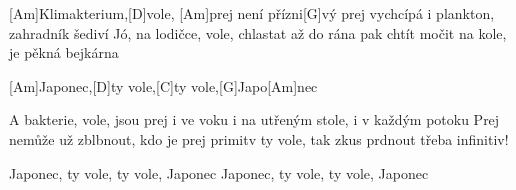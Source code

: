 
[Am]Klimakterium,[D]vole, [Am]prej není přízni[G]vý
prej vychcípá i plankton, zahradník šediví
Jó, na lodičce, vole, chlastat až do rána
pak chtít močit na kole, je pěkná bejkárna

[Am]Japonec,[D]ty vole,[C]ty vole,[G]Japo[Am]nec

A bakterie, vole, jsou prej i ve voku
i na utřeným stole, i v každým potoku
Prej nemůže už zblbnout, kdo je prej primitv
ty vole, tak zkus prdnout třeba infinitiv!

Japonec, ty vole, ty vole, Japonec
Japonec, ty vole, ty vole, Japonec